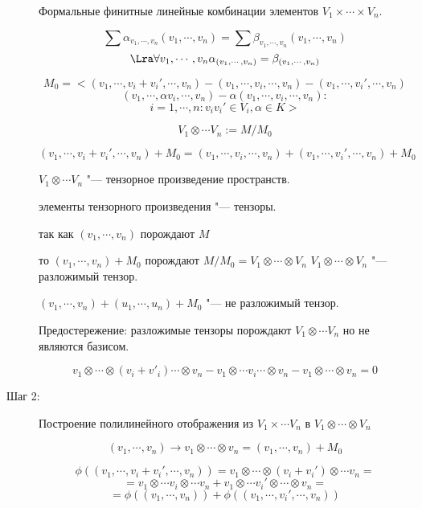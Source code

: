\begin{description}
    Формальные финитные линейные комбинации элементов $V_1 \times \cdots \times V_n$.

    $$\sum \alpha_{v_1, \cdots, v_n}(v_1, \cdots, v_n) = \sum \beta_{v_1, \cdots, v_n}(v_1, \cdots, v_n)$$ 
    $$\Lra \forall v_1, \cdots, v_n \alpha_{(v_1, \cdots,  v_n)} = \beta_{(v_1, \cdots, v_n)}$$

    $$M_0 = <(v_1, \cdots, v_i + v_i', \cdots, v_n) - (v_1, \cdots, v_i, \cdots, v_n) - (v_1, \cdots, v_i', \cdots, v_n)$$
    $$       (v_1, \cdots, \alpha v_i, \cdots, v_n) - \alpha(v_1,\cdots, v_i, \cdots, v_n)\colon  $$
    $$ i = 1, \cdots, n \colon v_i v_i' \in V_i, \alpha \in K>$$

    $$V_1 \otimes \cdots V_n := M/M_0$$
    
    $$(v_1, \cdots, v_i + v_i', \cdots, v_n) + M_0 = (v_1, \cdots, v_i, \cdots, v_n) + (v_1, \cdots, v_i',\cdots, v_n) + M_0$$
    
    \begin{Def}
    $V_1 \otimes \cdots V_n$ "--- тензорное произведение пространств. 

    элементы тензорного произведения "--- тензоры. 

    так как  $(v_1, \cdots, v_n)$ порождают $M$

    то $(v_1,\cdots, v_n) + M_0$ порождают $M/M_0 = V_1 \otimes \cdots \otimes V_n$
    $V_1 \otimes \cdots \otimes V_n$ "--- разложимый тензор. 
    \end{Def}
   
    $(v_1, \cdots, v_n) + (u_1, \cdots, u_n) + M_0$ "--- не разложимый тензор. 

    Предостережение: разложимые тензоры порождают $V_1 \otimes \cdots V_n$ 
    но не являются базисом.

    $$v_1 \otimes \cdots \otimes (v_i + v'_i) \cdots \otimes v_n - v_1 \otimes \cdots v_i \cdots \otimes v_n - v_1 \otimes \cdots \otimes v_n = 0$$
    \item[Шаг 2:] Построение полилинейного отображения из $V_1 \times \cdots V_n$ в $V_1 \otimes \cdots \otimes V_n$

    $$(v_1, \cdots, v_n) \to v_1 \otimes \cdots \otimes v_n = (v_1, \cdots, v_n) + M_0$$

    $$\phi((v_1, \cdots, v_i + v_i', \cdots, v_n)) = v_1 \otimes \cdots \otimes (v_i + v_i') \otimes \cdots v_n =$$
    $$= v_1 \otimes \cdots v_i \otimes \cdots v_n + v_1 \otimes \cdots v_i' \otimes \cdots \otimes v_n  = $$
    $$ = \phi ((v_1, \cdots, v_n)) + \phi((v_1, \cdots, v_i', \cdots, v_n))$$


\end{description}
